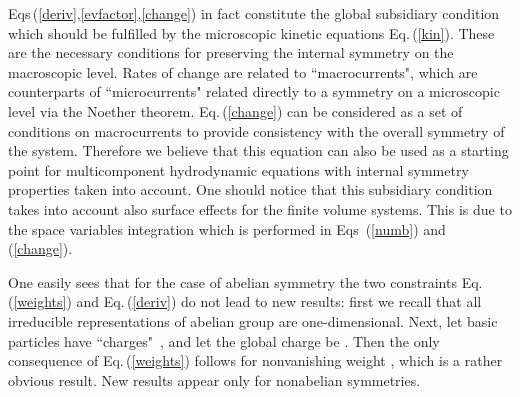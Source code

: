 \documentclass[a4paper,11pt]{article}
\begin{document}
Eqs\,(\ref{deriv},\ref{evfactor},\ref{change}) in fact constitute
the global subsidiary condition which should be fulfilled by the
 microscopic kinetic equations Eq.\,(\ref{kin}). These are the
necessary conditions for preserving the internal symmetry on the
macroscopic level. Rates of change
 \coordHE{}
are related to ``macrocurrents", which are counterparts of
``microcurrents" related directly to a symmetry on a microscopic
level via the Noether theorem. Eq.\,(\ref{change}) can be
considered as a set of conditions on macrocurrents to provide
consistency with the overall symmetry of the system. Therefore we
believe that this equation can also be used as a starting point
for multicomponent hydrodynamic equations with internal symmetry
properties taken into account. One should notice that this
subsidiary condition takes into account also surface effects for
the finite volume systems. This is due to the space variables
integration which is performed in Eqs\, (\ref{numb}) and
(\ref{change}).

One easily sees that for the case of abelian symmetry the two
constraints Eq.\,(\ref{weights}) and Eq.\,(\ref{deriv}) do not
lead to new results: first we recall that all irreducible
representations of abelian group are one-dimensional. Next, let
basic particles have ``charges" \coordHE{}\,, and let the
global charge be \coordHE{}. Then the only consequence of
Eq.\,(\ref{weights}) follows for nonvanishing weight \coordHE{}, which is a rather obvious result. New results
appear only for nonabelian symmetries.

\end{document}
